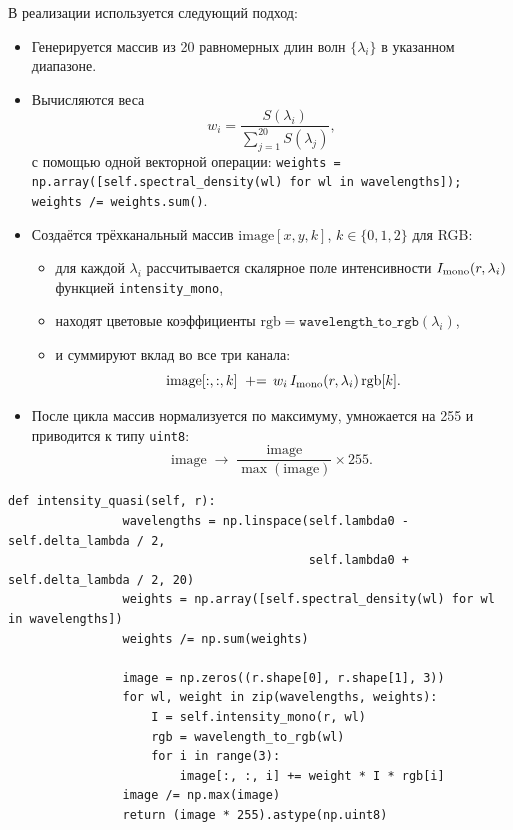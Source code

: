 \documentclass[a4paper,11pt]{article}
\theoremstyle{definition}
\begin{document}
\begin{itemize}
        В реализации используется следующий подход:
        \begin{itemize}
            \item Генерируется массив из 20 равномерных длин волн \(\{\lambda_i\}\) в указанном диапазоне.
            \item Вычисляются веса
            \[
                w_i = \frac{S(\lambda_i)}{\sum_{j=1}^{20} S(\lambda_j)},
            \]
            с помощью одной векторной операции:
            \texttt{weights = np.array([self.spectral\_density(wl) for wl in wavelengths]); weights /= weights.sum()}.
            \item Создаётся трёхканальный массив \(\mathrm{image}[x,y,k]\), \(k\in\{0,1,2\}\) для RGB:
            \begin{itemize}
                \item для каждой \(\lambda_i\) рассчитывается скалярное поле интенсивности
                \(I_{\rm mono}(r,\lambda_i)\) функцией \texttt{intensity\_mono},
                \item находят цветовые коэффициенты \(\mathrm{rgb} = \texttt{wavelength\_to\_rgb}(\lambda_i)\),
                \item и суммируют вклад во все три канала:
                \[
                    \mathrm{image}[:,:,k] \;\mathrel{+}=\, w_i\,I_{\rm mono}(r,\lambda_i)\,\mathrm{rgb}[k].
                \]
            \end{itemize}
            \item После цикла массив нормализуется по максимуму,
            умножается на 255 и приводится к типу \texttt{uint8}:
            \[
                \mathrm{image} \;\to\; \frac{\mathrm{image}}{\max(\mathrm{image})}\times255.
            \]
        \end{itemize}

        \begin{lstlisting}[language=MyPython,label={lst:lstlisting2}]
            def intensity_quasi(self, r):
                wavelengths = np.linspace(self.lambda0 - self.delta_lambda / 2,
                                          self.lambda0 + self.delta_lambda / 2, 20)
                weights = np.array([self.spectral_density(wl) for wl in wavelengths])
                weights /= np.sum(weights)

                image = np.zeros((r.shape[0], r.shape[1], 3))
                for wl, weight in zip(wavelengths, weights):
                    I = self.intensity_mono(r, wl)
                    rgb = wavelength_to_rgb(wl)
                    for i in range(3):
                        image[:, :, i] += weight * I * rgb[i]
                image /= np.max(image)
                return (image * 255).astype(np.uint8)
        \end{lstlisting}


\end{itemize}
\end{document}
